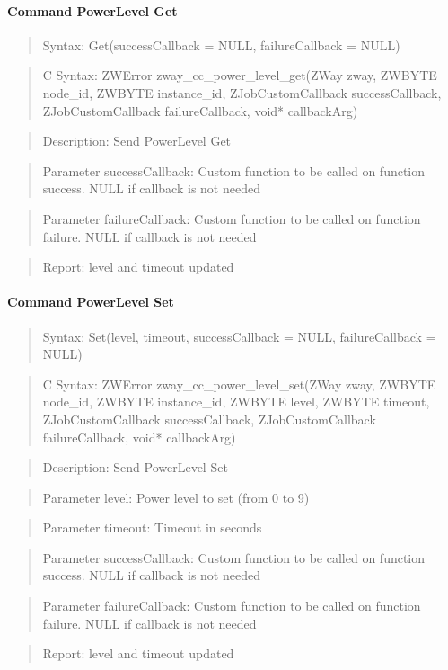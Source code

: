 \paragraph{Command PowerLevel Get}
\begin{quote}Syntax: Get(successCallback = NULL, failureCallback = NULL)\end{quote}
\begin{quote}C Syntax: ZWError zway\_cc\_power\_level\_get(ZWay zway, ZWBYTE node\_id, ZWBYTE instance\_id, ZJobCustomCallback successCallback, ZJobCustomCallback failureCallback, void* callbackArg)\end{quote}
\begin{quote}Description: Send PowerLevel Get\end{quote}
\begin{quote}Parameter successCallback: Custom function to be called on function success. NULL if callback is not needed\end{quote}
\begin{quote}Parameter failureCallback: Custom function to be called on function failure. NULL if callback is not needed\end{quote}
\begin{quote}Report: level and timeout updated\end{quote}

\paragraph{Command PowerLevel Set}
\begin{quote}Syntax: Set(level, timeout, successCallback = NULL, failureCallback = NULL)\end{quote}
\begin{quote}C Syntax: ZWError zway\_cc\_power\_level\_set(ZWay zway, ZWBYTE node\_id, ZWBYTE instance\_id, ZWBYTE level, ZWBYTE timeout, ZJobCustomCallback successCallback, ZJobCustomCallback failureCallback, void* callbackArg)\end{quote}
\begin{quote}Description: Send PowerLevel Set\end{quote}
\begin{quote}Parameter level: Power level to set (from 0 to 9)\end{quote}
\begin{quote}Parameter timeout: Timeout in seconds\end{quote}
\begin{quote}Parameter successCallback: Custom function to be called on function success. NULL if callback is not needed\end{quote}
\begin{quote}Parameter failureCallback: Custom function to be called on function failure. NULL if callback is not needed\end{quote}
\begin{quote}Report: level and timeout updated\end{quote}

